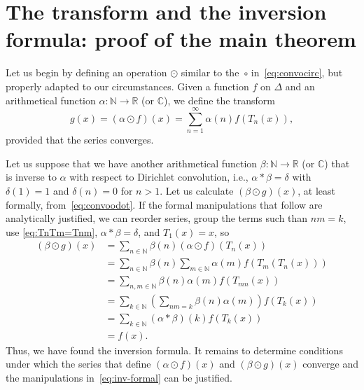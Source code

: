 \documentclass[10pt,a4paper]{amsart}
\theoremstyle{plain}
\theoremstyle{remark}
\newcommand{\N}{\mathbb{N}}
\newcommand{\R}{\mathbb{R}}
\newcommand{\C}{\mathbb{C}}
\begin{document}
\section{The transform and the inversion formula: proof of the main theorem}
\label{sec:transform}

Let us begin by defining an operation $\odot$ similar to the~$\circ$
in~\eqref{eq:convocirc}, but properly adapted to our circumstances.
Given a function $f$ on $\Delta$ and an arithmetical function
$\alpha: \N \to \R$ (or $\C$), we define the transform
\begin{equation}
\label{eq:convoodot}
  g(x) = (\alpha \odot f)(x) = \sum_{n=1}^\infty \alpha(n) f(T_n(x)),
\end{equation}
provided that the series converges.

Let us suppose that we have another arithmetical function $\beta: \N \to \R$ (or $\C$)
that is inverse to $\alpha$ with respect to Dirichlet convolution,
i.e., $\alpha * \beta = \delta$ with $\delta(1) = 1$ and $\delta(n)=0$ for $n>1$.
Let us calculate $(\beta \odot g)(x)$, at least formally, from~\eqref{eq:convoodot}. If the formal manipulations that follow are analytically justified, we can reorder series, group the terms such than $nm=k$, use \eqref{eq:TnTm=Tnm}, $\alpha * \beta = \delta$, and $T_1(x) = x$, so
\begin{equation}
\label{eq:inv-formal}
\begin{aligned}
  (\beta \odot g)(x)
  &= \sum_{n \in \N} \beta(n) (\alpha \odot f)(T_n(x)) \\
  &= \sum_{n \in \N} \beta(n) \sum_{m \in \N} \alpha(m) f(T_m(T_n(x))) \\
  &= \sum_{n,m \in \N} \beta(n) \alpha(m) f(T_{mn}(x)) \\
  &= \sum_{k \in \N} \left(\sum_{nm = k} \beta(n) \alpha(m) \right)
    f(T_k(x)) \\
  &= \sum_{k \in \N} (\alpha*\beta)(k) f(T_k(x)) \\
  &= f(x).
\end{aligned}
\end{equation}
Thus, we have found the inversion formula.
It remains to determine conditions under which the series that define $(\alpha \odot f)(x)$ and $(\beta \odot g)(x)$ converge and the manipulations in~\eqref{eq:inv-formal} can be justified.
\end{document}
